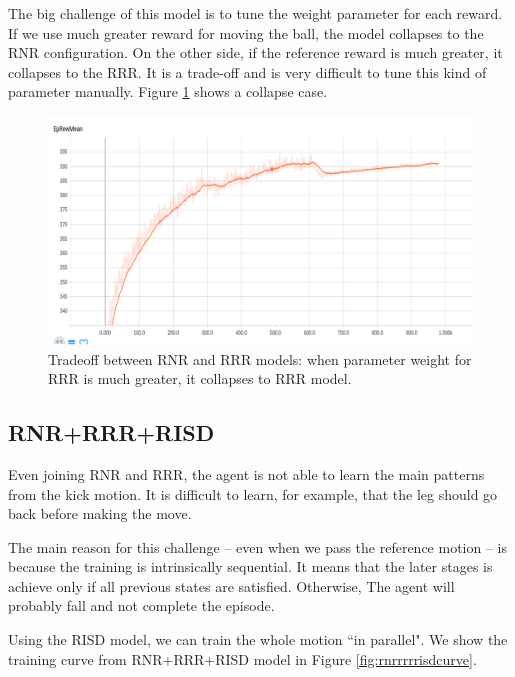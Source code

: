 The big challenge of this model is to tune the weight parameter for each reward. If we use much greater reward for moving the ball, the model collapses to the RNR configuration. On the other side, if the reference reward is much greater, it collapses to the RRR. It is a trade-off and is very difficult to tune this kind of parameter manually. Figure \ref{fig:rnrrrrtradeoff} shows a collapse case.


\begin{figure}[!htbp]
	\centering
	\includegraphics[width=1.0\textwidth]{Cap6/rnrrrrtradeoff.eps}
	\caption{Tradeoff between RNR and RRR models: when parameter weight for RRR is much greater, it collapses to RRR model.}
	\label{fig:rnrrrrtradeoff}
\end{figure}

\subsection{RNR+RRR+RISD}

Even joining RNR and RRR, the agent is not able to learn the main patterns from the kick motion. It is difficult to learn, for example, that the leg should go back before making the move.

The main reason for this challenge -- even when we pass the reference motion -- is because the training is intrinsically sequential. It means that the later stages is achieve only if all previous states are satisfied. Otherwise, The agent will probably fall and not complete the episode.

Using the RISD model, we can train the whole motion ``in parallel". We show the training curve from RNR+RRR+RISD model in Figure \ref{fig:rnrrrrrisdcurve}. 

